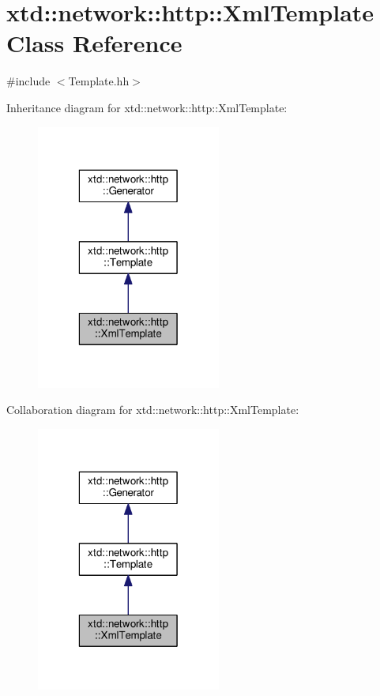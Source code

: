 \hypertarget{classxtd_1_1network_1_1http_1_1XmlTemplate}{\section{xtd\-:\-:network\-:\-:http\-:\-:Xml\-Template Class Reference}
\label{classxtd_1_1network_1_1http_1_1XmlTemplate}
}


{\ttfamily \#include $<$Template.\-hh$>$}



Inheritance diagram for xtd\-:\-:network\-:\-:http\-:\-:Xml\-Template\-:
\nopagebreak
\begin{figure}[H]
\begin{center}
\leavevmode
\includegraphics[width=172pt]{classxtd_1_1network_1_1http_1_1XmlTemplate__inherit__graph}
\end{center}
\end{figure}


Collaboration diagram for xtd\-:\-:network\-:\-:http\-:\-:Xml\-Template\-:
\nopagebreak
\begin{figure}[H]
\begin{center}
\leavevmode
\includegraphics[width=172pt]{classxtd_1_1network_1_1http_1_1XmlTemplate__coll__graph}
\end{center}
\end{figure}
